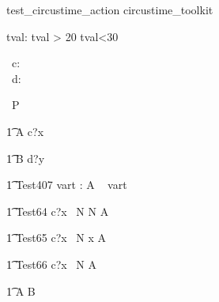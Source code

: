 \begin{zsection}
   \SECTION test\_circustime\_action \parents circustime\_toolkit
\end{zsection}


\begin{axdef}
   tval: \nat
\where
   tval > 20 \land tval<30
\end{axdef}


\begin{circus}
    \circchannel\ c: \nat \\
    \circchannel\ d: \nat \\
\end{circus}

\begin{circus}
    \circprocess\ P \circdef \circbegin \\
\end{circus}


\begin{circusaction}
    	\t1 A \circdef c?x \then \Skip \\
\end{circusaction}

\begin{circusaction}
        \t1 B \circdef d?y \then \Skip \\
\end{circusaction}


\begin{circusaction}
  \t1 Test407 \circdef \circwait vart : \nat  \circspot A \circseq \circwait~ vart \\
\end{circusaction}


\begin{circusaction}
    \t1 Test64 \circdef c?x \circat~N  \then \lcirctime N \rcirctime A \\
\end{circusaction}


\begin{circusaction}
    \t1 Test65 \circdef c?x \circat~N  \then \lcirctime x \rcirctime A \\
\end{circusaction}

 
\begin{circusaction}
    \t1 Test66 \circdef c?x \circat~N  \then {} \rcirctime A \\
\end{circusaction}




\begin{circusaction}        
        \t1 \circspot A \circseq B\\
\end{circusaction}


\begin{circus}    
\circend
\end{circus}
